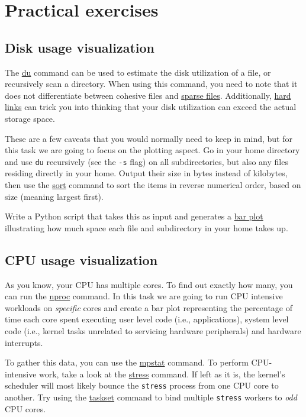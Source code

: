 \newpage

\section{Practical exercises}

\subsection{Disk usage visualization}

The \href{https://man.archlinux.org/man/du.1}{du} command can be used to
estimate the disk utilization of a file, or recursively scan a directory. When
using this command, you need to note that it does not differentiate between
cohesive files and \href{https://wiki.archlinux.org/title/Sparse_file}{sparse
files}. Additionally, \href{https://linuxhandbook.com/hard-link/}{hard links}
can trick you into thinking that your disk utilization can exceed the actual
storage space.

These are a few caveats that you would normally need to keep in mind, but for
this task we are going to focus on the plotting aspect. Go in your home
directory and use \texttt{du} recursively (see the \texttt{-s} flag) on all
subdirectories, but also any files residing directly in your home. Output their
size in bytes instead of kilobytes, then use the
\href{https://man.archlinux.org/man/sort.1}{sort} command to sort the items in
reverse numerical order, based on size (meaning largest first).

Write a Python script that takes this as input and generates a
\href{https://pythonguides.com/matplotlib-plot-bar-chart/}{bar plot}
illustrating how much space each file and subdirectory in your home takes up.

\subsection{CPU usage visualization}

As you know, your CPU has multiple cores. To find out exactly how many, you can
run the \href{https://man.archlinux.org/man/nproc.1}{nproc} command. In this
task we are going to run CPU intensive workloads on \textit{specific} cores and
create a bar plot representing the percentage of time each core spent executing
user level code (i.e., applications), system level code (i.e., kernel tasks
unrelated to servicing hardware peripherals) and hardware interrupts.

To gather this data, you can use the
\href{https://man.archlinux.org/man/mpstat.1}{mpstat} command. To
perform CPU-intensive work, take a look at the
\href{https://man.archlinux.org/man/stress.1}{stress} command. If left as it is,
the kernel's scheduler will most likely bounce the \texttt{stress} process from
one CPU core to another. Try using the
\href{https://man.archlinux.org/man/taskset.1}{taskset} command to bind multiple
\texttt{stress} workers to \textit{odd} CPU cores.

